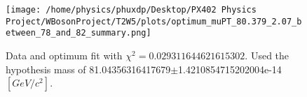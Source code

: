 \documentclass[12pt]{article}
\begin{document}
    \begin{figure}[tb]
		\centering
		\texttt{[image: /home/physics/phuxdp/Desktop/PX402 Physics Project/WBosonProject/T2W5/plots/optimum\_muPT\_80.379\_2.07\_between\_78\_and\_82\_summary.png]}
		\caption{\small Data and optimum fit with $\chi^2 = 0.029311644621615302$. Used the hypothesis mass of 81.04356316417679$\pm$1.4210854715202004e-14 $[GeV/c^{2}]$. }
		\label{fig: fig_optim_parms}
	\end{figure}
    
\end{document}
